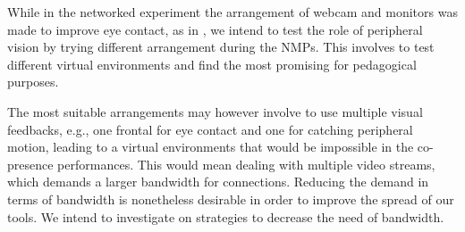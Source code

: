 While in the networked experiment the arrangement of webcam and monitors was made to improve eye contact, as in \cite{duffy2017new}, we intend to test the role of peripheral vision by trying different arrangement during the NMPs. This involves to test different virtual environments and find the most promising for pedagogical purposes.

The most suitable arrangements may however involve to use multiple visual feedbacks, e.g., one frontal for eye contact and one for catching peripheral motion, leading to a virtual environments that would be impossible in the co-presence performances. This would mean dealing with multiple video streams, which demands a larger bandwidth for connections. Reducing the demand in terms of bandwidth is nonetheless desirable in order to improve the spread of our tools. We intend to investigate on strategies to decrease the need of bandwidth.


